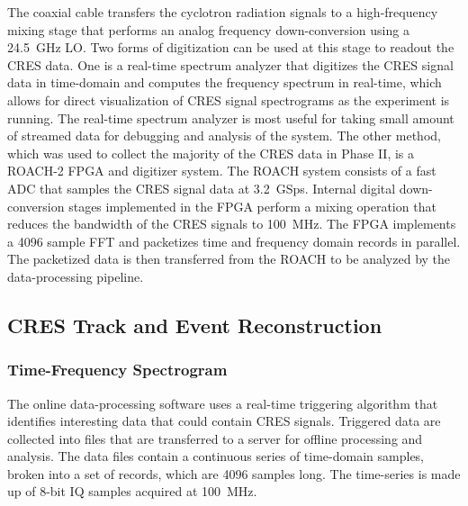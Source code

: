 The coaxial cable transfers the cyclotron radiation signals to a high-frequency mixing stage that performs an analog frequency down-conversion using a 24.5~GHz LO. Two forms of digitization can be used at this stage to readout the CRES data. One is a real-time spectrum analyzer that digitizes the CRES signal data in time-domain and computes the frequency spectrum in real-time, which allows for direct visualization of CRES signal spectrograms as the experiment is running. The real-time spectrum analyzer is most useful for taking small amount of streamed data for debugging and analysis of the system. The other method, which was used to collect the majority of the CRES data in Phase II, is a ROACH-2 FPGA and digitizer system. The ROACH system consists of a fast ADC that samples the CRES signal data at 3.2~GSps. Internal digital down-conversion stages implemented in the FPGA perform a mixing operation that reduces the bandwidth of the CRES signals to 100~MHz. The FPGA implements a 4096 sample FFT and packetizes time and frequency domain records in parallel. The packetized data is then transferred from the ROACH to be analyzed by the data-processing pipeline.

\subsection{CRES Track and Event Reconstruction}

\subsubsection*{Time-Frequency Spectrogram}

The online data-processing software uses a real-time triggering algorithm that identifies interesting data that could contain CRES signals. Triggered data are collected into files that are transferred to a server for offline processing and analysis. The data files contain a continuous series of time-domain samples, broken into a set of records, which are 4096 samples long. The time-series is made up of 8-bit IQ samples acquired at 100~MHz. 

